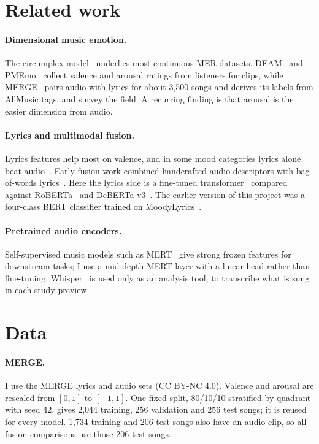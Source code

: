 \documentclass[10pt,twocolumn]{article}
\begin{document}
\section{Related work}

\paragraph{Dimensional music emotion.} The circumplex model~\citep{russell1980circumplex,posner2005circumplex} underlies most continuous MER datasets. DEAM~\citep{aljanaki2017deam} and PMEmo~\citep{zhang2018pmemo} collect valence and arousal ratings from listeners for clips, while MERGE~\citep{louro2024merge} pairs audio with lyrics for about 3,500 songs and derives its labels from AllMusic tags. \citet{kim2010mer} and \citet{yang2012review} survey the field. A recurring finding is that arousal is the easier dimension from audio.

\paragraph{Lyrics and multimodal fusion.} Lyrics features help most on valence, and in some mood categories lyrics alone beat audio~\citep{hu2010lyrics}. Early fusion work combined handcrafted audio descriptors with bag-of-words lyrics~\citep{laurier2008multimodal}. Here the lyrics side is a fine-tuned transformer~\citep{devlin2019bert} compared against RoBERTa~\citep{liu2019roberta} and DeBERTa-v3~\citep{he2023debertav3}. The earlier version of this project was a four-class BERT classifier trained on MoodyLyrics~\citep{cano2017moodylyrics}.

\paragraph{Pretrained audio encoders.} Self-supervised music models such as MERT~\citep{li2024mert} give strong frozen features for downstream tasks; I use a mid-depth MERT layer with a linear head rather than fine-tuning. Whisper~\citep{radford2023whisper} is used only as an analysis tool, to transcribe what is sung in each study preview.

\section{Data}
\label{sec:data}

\paragraph{MERGE.} I use the MERGE lyrics and audio sets (CC BY-NC 4.0). Valence and arousal are rescaled from $[0,1]$ to $[-1,1]$. One fixed split, 80/10/10 stratified by quadrant with seed 42, gives 2,044 training, 256 validation and 256 test songs; it is reused for every model. 1,734 training and 206 test songs also have an audio clip, so all fusion comparisons use those 206 test songs.
\end{document}
